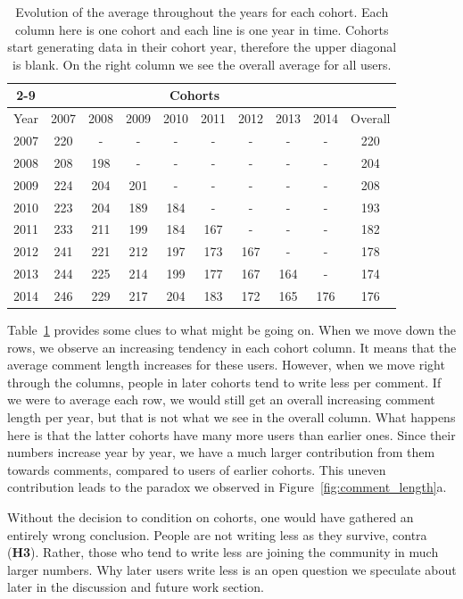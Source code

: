 \documentclass[10pt, oneside, onecolumn]{article}
\begin{document}
\begin{table}[!tb]
\centering
\tabcolsep=0.07cm
\singlespacing
\fontsize{9pt}{10.5pt}\selectfont
\begin{tabular}{|c|c|c|c|c|c|c|c|c|c|}
\cline{2-9}
\multicolumn{1}{c|}{} & \multicolumn{8}{c|}{Cohorts} \\ \hline
Year & 2007 & 2008 & 2009 & 2010 & 2011 & 2012 & 2013 & 2014 & Overall\\ \hline
2007 & 220 & - & - & - & - & - & - & - & 220 \\ \hline
2008 & 208 & 198 & - & - & - & - & - & - & 204 \\ \hline
2009 & 224 & 204 & 201 & - & - & - & - & - & 208 \\ \hline
2010 & 223 & 204 & 189 & 184 & - & - & - & - & 193 \\ \hline
2011 & 233 & 211 & 199 & 184 & 167 & - & - & - & 182 \\ \hline
2012 & 241 & 221 & 212 & 197 & 173 & 167 & - & - & 178 \\ \hline
2013 & 244 & 225 & 214 & 199 & 177 & 167 & 164 & - & 174 \\ \hline
2014 & 246 & 229 & 217 & 204 & 183 & 172 & 165 & 176 & 176 \\ \hline
\end{tabular}
\caption{Evolution of the average throughout the years for each cohort. Each column here is one cohort and each line is one year in time. Cohorts start generating data in their cohort year, therefore the upper diagonal is blank. On the right column we see the overall average for all users.}
\label{tab:simpson}
\end{table}

Table~\ref{tab:simpson} provides some clues to what might be going on. When we move down the rows, we observe an increasing tendency in each cohort column. It means that the average comment length increases for these users. However, when we move right through the columns, people in later cohorts tend to write less per comment. If we were to average each row, we would still get an overall increasing comment length per year, but that is not what we see in the overall column. What happens here is that the latter cohorts have many more users than earlier ones. Since their numbers increase year by year, we have a much larger contribution from them towards comments, compared to users of earlier cohorts. This uneven contribution leads to the paradox we observed in Figure~\ref{fig:comment_length}a. 

Without the decision to condition on cohorts, one would have gathered an entirely wrong conclusion. People are not writing less as they survive, contra (\textbf{H3}).  Rather, those who tend to write less are joining the community in much larger numbers.  Why later users write less is an open question we speculate about later in the discussion and future work section.
\end{document}
